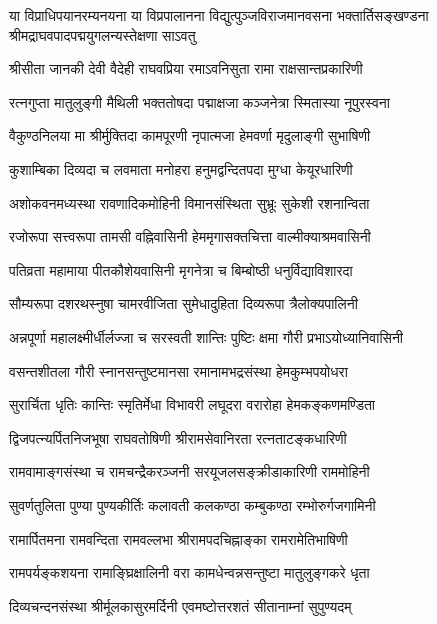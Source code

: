 
{या विप्राधिपयानरम्यनयना या विप्रपालानना}
{विद्युत्पुञ्जविराजमानवसना भक्तार्तिसङ्खण्डना}
{श्रीमद्राघवपादपद्मयुगलन्यस्तेक्षणा साऽवतु}

\twolineshloka
{श्रीसीता जानकी देवी वैदेही राघवप्रिया}
{रमाऽवनिसुता रामा राक्षसान्तप्रकारिणी}

\twolineshloka
{रत्नगुप्ता मातुलुङ्गी मैथिली भक्ततोषदा}
{पद्माक्षजा कञ्जनेत्रा स्मितास्या नूपुरस्वना}

\twolineshloka
{वैकुण्ठनिलया मा श्रीर्मुक्तिदा कामपूरणी}
{नृपात्मजा हेमवर्णा मृदुलाङ्गी सुभाषिणी}

\twolineshloka
{कुशाम्बिका दिव्यदा च लवमाता मनोहरा}
{हनुमद्वन्दितपदा मुग्धा केयूरधारिणी}

\twolineshloka
{अशोकवनमध्यस्था रावणादिकमोहिनी}
{विमानसंस्थिता सुभ्रूः सुकेशी रशनान्विता}

\twolineshloka
{रजोरूपा सत्त्वरूपा तामसी वह्निवासिनी}
{हेममृगासक्तचित्ता वाल्मीक्याश्रमवासिनी}

\twolineshloka
{पतिव्रता महामाया पीतकौशेयवासिनी}
{मृगनेत्रा च बिम्बोष्ठी धनुर्विद्याविशारदा}

\twolineshloka
{सौम्यरूपा दशरथस्नुषा चामरवीजिता}
{सुमेधादुहिता दिव्यरूपा त्रैलोक्यपालिनी}

\twolineshloka
{अन्नपूर्णा महालक्ष्मीर्धीर्लज्जा च सरस्वती}
{शान्तिः पुष्टिः क्षमा गौरी प्रभाऽयोध्यानिवासिनी}

\twolineshloka
{वसन्तशीतला गौरी स्नानसन्तुष्टमानसा}
{रमानामभद्रसंस्था हेमकुम्भपयोधरा}

\twolineshloka
{सुरार्चिता धृतिः कान्तिः स्मृतिर्मेधा विभावरी}
{लघूदरा वरारोहा हेमकङ्कणमण्डिता}

\twolineshloka
{द्विजपत्न्यर्पितनिजभूषा राघवतोषिणी}
{श्रीरामसेवानिरता रत्नताटङ्कधारिणी}

\twolineshloka
{रामवामाङ्गसंस्था च रामचन्द्रैकरञ्जनी}
{सरयूजलसङ्क्रीडाकारिणी राममोहिनी}

\twolineshloka
{सुवर्णतुलिता पुण्या पुण्यकीर्तिः कलावती}
{कलकण्ठा कम्बुकण्ठा रम्भोरुर्गजगामिनी}

\twolineshloka
{रामार्पितमना रामवन्दिता रामवल्लभा}
{श्रीरामपदचिह्नाङ्का रामरामेतिभाषिणी}

\twolineshloka
{रामपर्यङ्कशयना रामाङ्घ्रिक्षालिनी वरा}
{कामधेन्वन्नसन्तुष्टा मातुलुङ्गकरे धृता}

\twolineshloka
{दिव्यचन्दनसंस्था श्रीर्मूलकासुरमर्दिनी}
{एवमष्टोत्तरशतं सीतानाम्नां सुपुण्यदम्}


